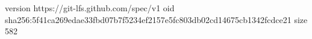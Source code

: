 version https://git-lfs.github.com/spec/v1
oid sha256:5f41ca269edae33fbd07b7f5234ef2157e5fc803db02cd14675cb1342fcdce21
size 582
